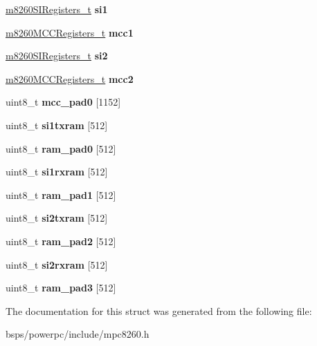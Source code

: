 \begin{DoxyCompactItemize}
\item 
\mbox{\label{structm8260___a31425359c72288f8512050a0cb7a0180}} 
\mbox{\hyperlink{structm8260SIRegisters__}{m8260\+S\+I\+Registers\+\_\+t}} {\bfseries si1}
\item 
\mbox{\label{structm8260___a54f4186f6576d75eb63abb8dadb8062d}} 
\mbox{\hyperlink{structm8260MCCRegisters__}{m8260\+M\+C\+C\+Registers\+\_\+t}} {\bfseries mcc1}
\item 
\mbox{\label{structm8260___a44b3efd342cfd740bbec60363d37eecf}} 
\mbox{\hyperlink{structm8260SIRegisters__}{m8260\+S\+I\+Registers\+\_\+t}} {\bfseries si2}
\item 
\mbox{\label{structm8260___a843ab60066708e2db17d04983b616f14}} 
\mbox{\hyperlink{structm8260MCCRegisters__}{m8260\+M\+C\+C\+Registers\+\_\+t}} {\bfseries mcc2}
\item 
\mbox{\label{structm8260___a876ea3184f21739bdb2f9573ad756da6}} 
uint8\+\_\+t {\bfseries mcc\+\_\+pad0} \mbox{[}1152\mbox{]}
\item 
\mbox{\label{structm8260___aa24b118c26d2cb80394ab577b3f8a78f}} 
uint8\+\_\+t {\bfseries si1txram} \mbox{[}512\mbox{]}
\item 
\mbox{\label{structm8260___aeae8042ade68b47c2b288bb987bb7860}} 
uint8\+\_\+t {\bfseries ram\+\_\+pad0} \mbox{[}512\mbox{]}
\item 
\mbox{\label{structm8260___a88eaf7cba9b7ed9cd5de34da547ab821}} 
uint8\+\_\+t {\bfseries si1rxram} \mbox{[}512\mbox{]}
\item 
\mbox{\label{structm8260___aebbc5b27738a1fc7dbb60869cd819aa4}} 
uint8\+\_\+t {\bfseries ram\+\_\+pad1} \mbox{[}512\mbox{]}
\item 
\mbox{\label{structm8260___a550ee91cbaa9021a77a520b922ec56bd}} 
uint8\+\_\+t {\bfseries si2txram} \mbox{[}512\mbox{]}
\item 
\mbox{\label{structm8260___ae65c873dbb6af159304f984e2843516e}} 
uint8\+\_\+t {\bfseries ram\+\_\+pad2} \mbox{[}512\mbox{]}
\item 
\mbox{\label{structm8260___a47336f00bcef836ab3895c3dccd743ed}} 
uint8\+\_\+t {\bfseries si2rxram} \mbox{[}512\mbox{]}
\item 
\mbox{\label{structm8260___a25558dde6353fd1ac61a839099ab203e}} 
uint8\+\_\+t {\bfseries ram\+\_\+pad3} \mbox{[}512\mbox{]}
\end{DoxyCompactItemize}


The documentation for this struct was generated from the following file\+:\begin{DoxyCompactItemize}
\item 
bsps/powerpc/include/mpc8260.\+h\end{DoxyCompactItemize}
